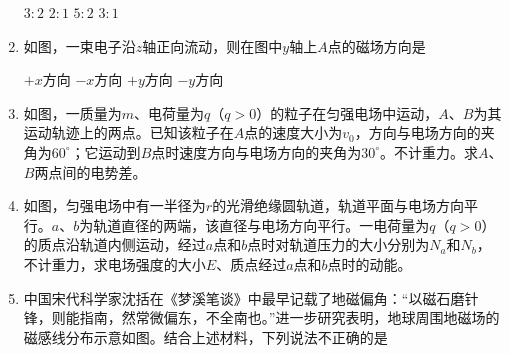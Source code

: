 \begin{enumerate}[leftmargin=0em]
\fourchoices
{$ 3:2 $}
{$ 2:1 $}
{$ 5:2 $}
{$ 3:1 $}

\item
{}
如图，一束电子沿$ z $轴正向流动，则在图中$ y $轴上$ A $点的磁场方向是  
\begin{figure}[h!]
\centering

\end{figure}


\fourchoices
{$ +x $方向}
{$ -x $方向}
{$ +y $方向}
{$ -y $方向}	



\item
{}
如图，一质量为$ m $、电荷量为$ q $（$ q>0 $）的粒子在匀强电场中运动，$ A $、$ B $为其运动轨迹上的两点。已知该粒子在$ A $点的速度大小为$ v_{0} $，方向与电场方向的夹角为$ 60 ^{ \circ } $；它运动到$ B $点时速度方向与电场方向的夹角为$ 30 ^{ \circ } $。不计重力。求$ A $、$ B $两点间的电势差。
\begin{figure}[h!]
\flushright

\end{figure}





\item
{}
如图，匀强电场中有一半径为$ r $的光滑绝缘圆轨道，轨道平面与电场方向平行。$ a $、$ b $为轨道直径的两端，该直径与电场方向平行。一电荷量为$ q $（$ q>0 $）的质点沿轨道内侧运动，经过$ a $点和$ b $点时对轨道压力的大小分别为$ N_a $和$ N_b $，不计重力，求电场强度的大小$ E $、质点经过$ a $点和$ b $点时的动能。
\begin{figure}[h!]
\flushright

\end{figure}










\newpage
\item
{}
中国宋代科学家沈括在《梦溪笔谈》中最早记载了地磁偏角：“以磁石磨针锋，则能指南，然常微偏东，不全南也。”进一步研究表明，地球周围地磁场的磁感线分布示意如图。结合上述材料，下列说法不正确的是  
\begin{figure}[h!]
	\centering
	
\end{figure}


\end{enumerate}
